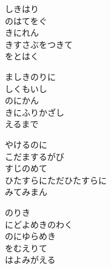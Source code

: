 \documentclass[10pt,b5j]{tarticle} %
\begin{document}
\vspace{1.5em} %
\newcommand{\linespace}{0.5em} %
\newcommand{\blocksize}{0.5\hsize} %
\begin{enumerate} %
    \begin{minipage}[c]{\blocksize}
    
        \vspace{\linespace}
        \item
        しきはり\\
        のはてをぐ\\
        きにれん\\
        きすさぶをつきて\\
        をとはく
        
        \vspace{\linespace}
        \item
        ましきのりに\\
        しくもいし\\
        のにかん\\
        きにふりかざし\\
        えるまで
        
        \vspace{\linespace}
        \item
        やけるのに\\
        こだまするがび\\
        すじのめて\\
        ひたすらにただひたすらに\\
        みてみまん
        
        \vspace{\linespace}
        \item
        のりき\\
        にどよめきのわく\\
        のにゆらめき\\
        をむえりて\\
        はよみがえる
    
    \end{minipage}
\end{enumerate} %
\end{document}
